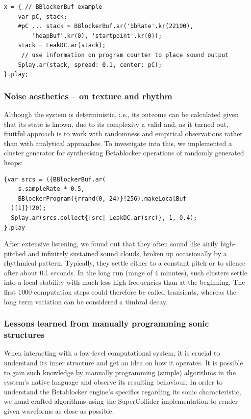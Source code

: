 \documentclass[letterpaper, 12pt]{article}
\begin{document}
\begin{Verbatim}[fontfamily=courier, xleftmargin=\parindent]
x = { // BBlockerBuf example
	var pC, stack;
	#pC ... stack = BBlockerBuf.ar('bbRate'.kr(22100),
		'heapBuf'.kr(0), 'startpoint'.kr(0));
	stack = LeakDC.ar(stack);
	 // use information on program counter to place sound output
	Splay.ar(stack, spread: 0.1, center: pC);
}.play;
\end{Verbatim}
\parskip 18pt

\subsubsection{Noise aesthetics -- on texture and rhythm}
\label{sub:noise_aesthetics}

Although the system is deterministic, i.e., its outcome can be calculated given that its state is known, due to its complexity a valid and, as it turned out, fruitful approach is to work with randomness and empirical observations rather than with analytical approaches.
To investigate into this, we implemented a cluster generator for synthesising Betablocker operations of randomly generated heaps:
\begin{Verbatim}[fontfamily=courier, xleftmargin=\parindent]
{var srcs = ({BBlockerBuf.ar(
    s.sampleRate * 0.5,
    BBlockerProgram({rrand(0, 24)}!256).makeLocalBuf
  )[1]}!20);
  Splay.ar(srcs.collect{|src| LeakDC.ar(src)}, 1, 0.4);
}.play
\end{Verbatim}
After extensive listening, we found out that they often sound like airily high-pitched and infinitely sustained sound clouds, broken up occasionally by a rhythmical pattern.
Typically, they settle either to a constant pitch or to silence after about 0.1 seconds.
In the long run (range of 4 minutes), such clusters settle into a local stability with much less high frequencies than at the beginning.
The first 1000 computation steps could therefore be called transients, whereas the long term variation can be considered a timbral decay.
\parskip 18pt

\subsubsection{Lessons learned from manually programming sonic structures}
\label{sub:manual_programming_sonic_structures}

When interacting with a low-level computational system, it is crucial to understand its inner structure and get an idea on how it operates.
It is possible to gain such knowledge by manually programming (simple) algorithms in the system's native language and observe its resulting behaviour.
In order to understand the Betablocker engine's specifics regarding its sonic characteristic, we hand-crafted algorithms using the SuperCollider implementation to render given waveforms as close as possible.
\end{document}

